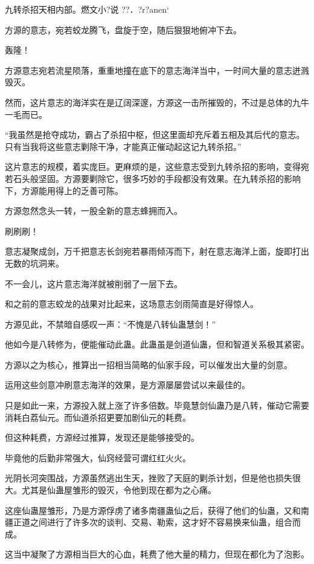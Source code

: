 
\begin{this_body}

九转杀招天相内部。燃文小?说    ??．?r?anen`

方源的意志，宛若蛟龙腾飞，盘旋于空，随后狠狠地俯冲下去。

轰隆！

方源意志宛若流星陨落，重重地撞在底下的意志海洋当中，一时间大量的意志迸溅毁灭。

然而，这片意志的海洋实在是辽阔深邃，方源这一击所摧毁的，不过是总体的九牛一毛而已。

“我虽然是抢夺成功，霸占了杀招中枢，但这里面却充斥着五相及其后代的意志。只有当我将这些意志剿除干净，才能真正催动起这记九转杀招。”

这片意志的规模，着实庞巨。更麻烦的是，这些意志受到九转杀招的影响，变得宛若石头般坚固。方源要剿除它，很多巧妙的手段都没有效果。在九转杀招的影响下，方源能用得上的乏善可陈。

方源忽然念头一转，一股全新的意志蜂拥而入。

刷刷刷！

意志凝聚成剑，万千把意志长剑宛若暴雨倾泻而下，射在意志海洋上面，旋即打出无数的坑洞来。

不一会儿，这片意志海洋就被削弱了一层下去。

和之前的意志蛟龙的战果对比起来，这场意志剑雨简直是好得惊人。

方源见此，不禁暗自感叹一声：“不愧是八转仙蛊慧剑！”

他如今是八转修为，便能催动此蛊。此蛊虽是剑道仙蛊，但和智道关系极其紧密。

方源以之为核心，推算出一招相当简略的仙家手段，可以催发出大量的剑意。

运用这些剑意冲刷意志海洋的效果，是方源屡屡尝试以来最佳的。

只是如此一来，方源投入就上涨了许多倍数。毕竟慧剑仙蛊乃是八转，催动它需要消耗白荔仙元。而仙道杀招更要加剧仙元的耗费。

但这种耗费，方源经过推算，发现还是能够接受的。

毕竟他的后勤非常强大，仙窍经营可谓红红火火。

光阴长河突围战，方源虽然逃出生天，挫败了天庭的剿杀计划，但是他也损失很大。尤其是仙蛊屋雏形的毁灭，令他到现在都为之心痛。

这座仙蛊屋雏形，乃是方源俘虏了诸多南疆蛊仙之后，获得了他们的仙蛊，又和南疆正道之间进行了许多次的谈判、交易、勒索，这才好不容易换来仙蛊，组合而成。

这当中凝聚了方源相当巨大的心血，耗费了他大量的精力，但现在都化为了泡影。


\end{this_body}
